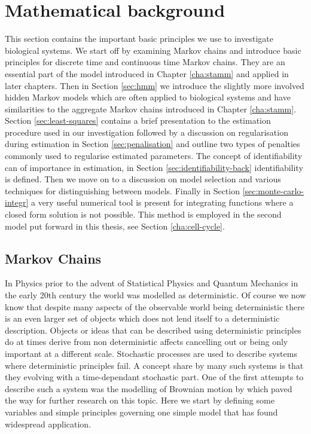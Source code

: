 \section{Mathematical background}
\label{sec:math-backgr}

This section contains the important basic principles we use to investigate biological systems. We start off by examining Markov chains and introduce basic principles for discrete time and continuous time Markov chains. They  are an essential part of the model introduced in Chapter \ref{cha:stamm} and applied in later chapters. Then in Section \ref{sec:hmm} we introduce the slightly more involved hidden Markov models which are often applied to biological systems and have similarities to the aggregate Markov chains introduced in Chapter \ref{cha:stamm}. Section \ref{sec:least-squares} contains a brief presentation to the estimation procedure used in our investigation followed by a discussion on regularisation during estimation in Section \ref{sec:penalisation} and outline two types of penalties commonly used to regularise estimated parameters. The concept of identifiability can of importance in estimation, in Section \ref{sec:identifiability-back} identifiability is defined. Then we move on to a discussion on model selection and various techniques for distinguishing between models. Finally in Section \ref{sec:monte-carlo-integr} a very useful numerical tool is present for integrating functions where a closed form solution is not possible. This method is employed in the second model put forward in this thesis, see Section \ref{cha:cell-cycle}.

\subsection{Markov Chains}
\label{sec:markov-chains}

In Physics prior to the advent of Statistical Physics and Quantum Mechanics in the early 20th century the world was modelled as deterministic. Of course we now know that despite many aspects of the observable world being deterministic there is an even larger set of objects which does not lend itself to a deterministic description. Objects or ideas that can be described using deterministic principles do at times derive from non deterministic affects cancelling out or being only important at a different scale. Stochastic processes are used to describe systems where deterministic principles fail. A concept share by many such systems is that they evolving with a time-dependant stochastic part. One of the first attempts to describe such a system was the modelling of Brownian motion by \cite{Einstein:2005ww} which paved the way for further research on this topic. Here we start by defining some variables and simple principles governing one simple model that has found widespread application.

